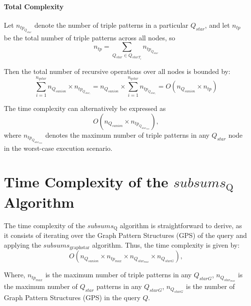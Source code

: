 \paragraph{Total Complexity}
Let $n_{tp_{Q_{star}}}$ denote the number of triple patterns in a particular $Q_{star}$, and let $n_{tp}$ be the total number of triple patterns across all nodes, so
$$
n_{tp} = \sum_{Q_{star} \in Q_{starT_i}} n_{tp_{Q_{star}}}
$$

Then the total number of recursive operations over all nodes is bounded by:
$$
\sum_{i=1}^{n_{qstar}} n_{Q_{sunion}} \times n_{tp_{Q_{star_i}}} = n_{Q_{sunion}} \times \sum_{i=1}^{n_{qstar}} n_{tp_{Q_{star_i}}} = O(n_{Q_{sunion}} \times n_{tp})
$$

The time complexity can alternatively be expressed as
\begin{equation}
O(n_{Q_{sunion}} \times n_{tp_{Q_{star_{max}}}}),
\end{equation}
where $n_{tp_{Q_{star_{max}}}}$ denotes the maximum number of triple patterns in any $Q_{star}$ node in the worst-case execution scenario.

\section{Time Complexity of the $subsums_{\mathrm{Q}}$ Algorithm}



The time complexity of the $subsums_{\mathrm{Q}}$ algorithm is straightforward to derive, as it consists of iterating over the Graph Pattern Structures (GPS) of the query and applying the $subsums_{\mathrm{graph star}}$ algorithm. Thus, the time complexity is given by:
\begin{equation}
O(n_{Q_{sunion}} \times n_{tp_{max}} \times n_{Q_{star_{max}}} \times n_{Q_{starG}}),
\end{equation}

Where, $n_{tp_{max}}$ is the maximum number of triple patterns in any $Q_{starG}$,
$n_{Q_{star_{max}}}$ is the maximum number of $Q_{star}$ patterns in any $Q_{starG}$,
$n_{Q_{starG}}$ is the number of Graph Pattern Structures (GPS) in the query $Q$.
